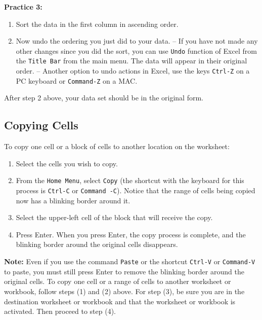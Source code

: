 \documentclass[
]{book}
\providecommand{\tightlist}{%
  \setlength{\itemsep}{0pt}\setlength{\parskip}{0pt}}
\begin{document}
\textbf{Practice 3:}

\begin{enumerate}
\def\labelenumi{\arabic{enumi}.}
\tightlist
\item
  Sort the data in the first column in ascending order.
\item
  Now undo the ordering you just did to your data.
  -- If you have not made any other changes since you did the sort, you can use \texttt{Undo} function of Excel from the \texttt{Title\ Bar} from the main menu. The data will appear in their original order.
  -- Another option to undo actions in Excel, use the keys \texttt{Ctrl-Z} on a PC keyboard or \texttt{Command-Z} on a MAC.
\end{enumerate}

After step 2 above, your data set should be in the original form.

\hypertarget{copying-cells}{%
\subsection{Copying Cells}\label{copying-cells}}

To copy one cell or a block of cells to another location on the worksheet:

\begin{enumerate}
\def\labelenumi{\arabic{enumi}.}
\tightlist
\item
  Select the cells you wish to copy.
\item
  From the \texttt{Home\ Menu}, select \texttt{Copy} (the shortcut with the keyboard for this process is \texttt{Ctrl-C} or \texttt{Command\ -C}). Notice that the range of cells being copied now has a blinking border around it.
\item
  Select the upper-left cell of the block that will receive the copy.
\item
  Press Enter. When you press Enter, the copy process is complete, and the blinking border around the original cells disappears.
\end{enumerate}

\textbf{Note:} Even if you use the command \texttt{Paste} or the shortcut \texttt{Ctrl-V} or \texttt{Command-V} to paste, you must still press Enter to remove the blinking border around the original cells. To copy one cell or a range of cells to another worksheet or workbook, follow steps (1) and (2) above. For step
(3), be sure you are in the destination worksheet or workbook and that the worksheet or workbook is activated. Then proceed to step (4).
\end{document}
